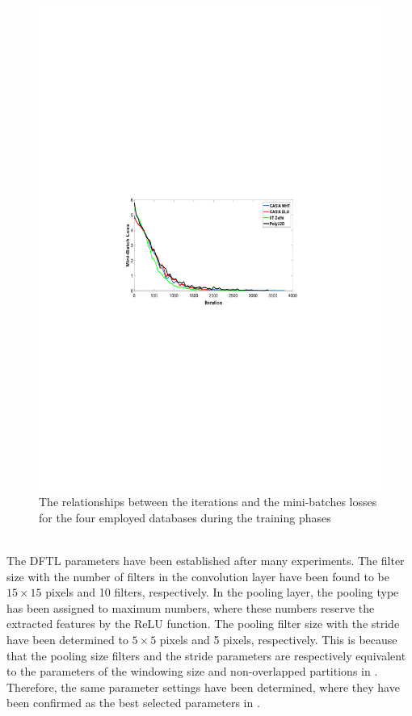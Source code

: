 \documentclass[conference]{IEEEtran}
\begin{document}
\begin{figure}[!b]
    \centering
    \includegraphics[page=1,scale=.8,trim=5cm 11.25cm 5cm 11.25cm,clip]{Iteration_vs_Loss_All_Databases.pdf}
    \caption{The relationships between the iterations and the mini-batches losses for the four employed databases during the training phases}
    \label{fig:Training_curves}
\end{figure}\\
The DFTL parameters have been established after many experiments. The filter size with the number of filters in the convolution layer have been found to be $15 \times 15$ pixels and 10 filters, respectively. In the pooling layer, the pooling type has been assigned to maximum numbers, where these numbers reserve the extracted features by the ReLU function. The pooling filter size with the stride have been determined to $5 \times 5$ pixels and 5 pixels, respectively. This is because that the pooling size filters and the stride parameters are respectively equivalent to the parameters of the windowing size and non-overlapped partitions in \cite{Al-Nima2015Human} \cite{Al-Nima2016Robust} \cite{Al-Nima2017efficient} \cite{Al-Nima2017finger}. Therefore, the same parameter settings have been determined, where they have been confirmed as the best selected parameters in \cite{Al-Nima2017Signal}.
\end{document}
